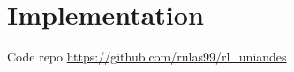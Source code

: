 
\section{Implementation}
\label{sec:implementation}


Code repo \url{https://github.com/rulas99/rl_uniandes}

\endinput


